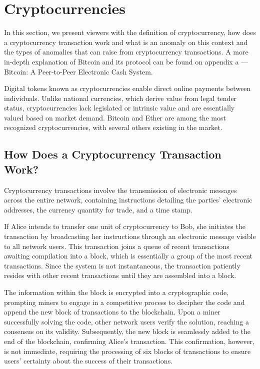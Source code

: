 \section{Cryptocurrencies}
In this section, we present viewers with the definition of cryptocurrency, how does a cryptocurrency transaction work
and what is an anomaly on this context and the types of anomalies that can raise from cryptocurrency transactions. A
more in-depth explanation of Bitcoin and its protocol can be found on appendix a --- Bitcoin: A Peer-to-Peer Electronic
Cash System.

Digital tokens known as cryptocurrencies enable direct online payments between individuals. Unlike national currencies,
which derive value from legal tender status, cryptocurrencies lack legislated or intrinsic value and are essentially
valued based on market demand. Bitcoin and Ether are among the most recognized cryptocurrencies, with several others
existing in the market.

\subsection{How Does a Cryptocurrency Transaction Work?}
Cryptocurrency transactions involve the transmission of electronic messages across the entire network, containing
instructions detailing the parties' electronic addresses, the currency quantity for trade, and a time stamp.

If Alice intends to transfer one unit of cryptocurrency to Bob, she initiates the transaction by broadcasting her
instructions through an electronic message visible to all network users. This transaction joins a queue of recent
transactions awaiting compilation into a block, which is essentially a group of the most recent transactions. Since the
system is not instantaneous, the transaction patiently resides with other recent transactions until they are assembled
into a block.

The information within the block is encrypted into a cryptographic code, prompting miners to engage in a competitive
process to decipher the code and append the new block of transactions to the blockchain. Upon a miner successfully
solving the code, other network users verify the solution, reaching a consensus on its validity. Subsequently, the new
block is seamlessly added to the end of the blockchain, confirming Alice's transaction. This confirmation, however, is
not immediate, requiring the processing of six blocks of transactions to ensure users' certainty about the success of
their transactions.


